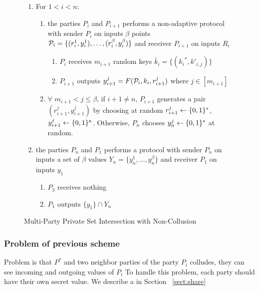 \begin{figure}[h]
{\begin{minipage}{0.95\linewidth}
\begin{enumerate}
				\item For $1<i< n:$
				\begin{enumerate}
					\item the parties $P_i$ and $P_{i+1}$ performs a non-adaptive \OPPRF protocol with sender $P_i$ on inputs $\beta$ points $\P_i=\{ (r^1_i, y^1_i), \ldots, (r^{\beta}_{i}, y^{\beta}_{i}) \}$ and receiver $P_{i+1}$ on inputs  $R_i$
					\begin{enumerate} 
						\item $P_i$ receives $m_{i+1}$ random keys $\bar{k}_i=\{({k_i}^*,{k}'_{i,j})\}$ 
						\item $P_{i+1}$  outputs $y^j_{i+1}=F( \P_i,{k}_i, r^j_{i+1})$ where $j \in [m_{i+1}]$	
					\end{enumerate}
					\item $\forall$ $ m_{i+1} < j \leq \beta$, if $i+1 \neq n$, $P_{i+1}$ generates a pair $({r}^j_{i+1}, {y}^{j}_{i+1})$ by choosing at random ${r}^j_{i+1} \from\bool^*$,  ${y}^j_{i+1} \from\bool^\kappa$. Otherwise,  $P_n$ chooses ${y}^j_n \from \bool^*$ at random.
				\end{enumerate}
				
				\item the parties $P_n$ and $P_1$ performs a \PSI protocol with sender $P_n$ on inputs a set of $\beta$ values $Y_n=\{ y^1_n, \ldots, y^{\beta}_{n} \}$ and receiver $P_1$ on inputs  $y_1$
				\begin{enumerate} 
					\item $P_3$ receives nothing
					\item $P_1$ outputs $\{y_1\} \cap Y_n$	
				\end{enumerate}		
			\end{enumerate}		
		\end{minipage}
	}
\caption{Multi-Party Private Set Intersection with Non-Collusion}
\label{fig:npsicollud}
\end{figure}

\subsubsection{Problem of previous scheme}
Problem is that $P^*$ and two neighbor parties of the party $P_i$ colludes, they can see incoming and outgoing values of $P_i$  To handle this problem, each party should have their own secret value. We describe a  in Section ~\ref{sect:share}



